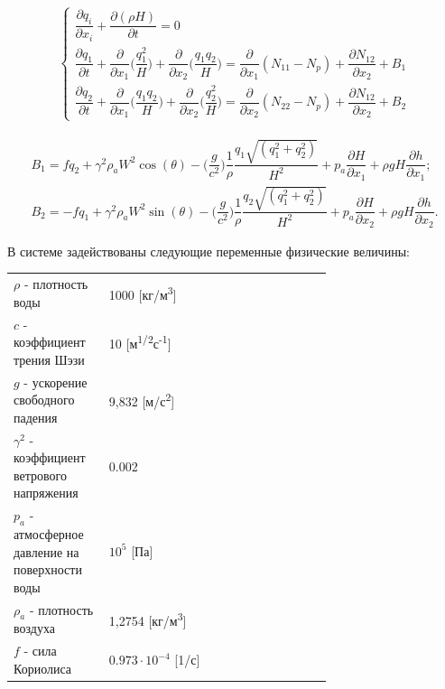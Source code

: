 \documentclass[14pt]{extreport}
\begin{document}
\begin{eqnarray}\label{eq:task:1}
\begin{cases}
\dfrac{ \partial q_i}{\partial x_i} + \dfrac{\partial(\rho H)}{\partial t} = 0 \\
\dfrac{\partial q_1}{\partial t} + \dfrac{\partial}{\partial x_1} \bigg(\dfrac{q_1^2}{H}\bigg)+\dfrac{\partial }{\partial x_2}\bigg(\dfrac{q_1 q_2}{H}\bigg) = \dfrac{\partial}{\partial x_1} (N_{11}-N_p) + \dfrac{\partial N_{12}}{\partial x_2} + B_1 \\
\dfrac{\partial q_2}{\partial t} + \dfrac{\partial}{\partial x_1} \bigg(\dfrac{q_1 q_2}{H}\bigg)+\dfrac{\partial }{\partial x_2}\bigg(\dfrac{q_2^2}{H}\bigg) = \dfrac{\partial}{\partial x_2} (N_{22}-N_p) + \dfrac{\partial N_{12}}{\partial x_2} + B_2
\end{cases}
\end{eqnarray}


\begin{equation}\label{eq:task:2}
\begin{aligned}
B_1=fq_2+\gamma^2\rho_aW^2\cos(\theta)-\bigg(\dfrac{g}{c^2}\bigg)\dfrac{1}{\rho}\dfrac{q_1\sqrt{(q_1^2+q_2^2)}}{H^2} + p_a \dfrac{\partial H}{\partial x_1} + \rho gH\dfrac{\partial h}{\partial x_1}; \\
B_2=-fq_1+\gamma^2\rho_aW^2\sin(\theta)-\bigg(\dfrac{g}{c^2}\bigg)\dfrac{1}{\rho}\dfrac{q_2\sqrt{(q_1^2+q_2^2)}}{H^2} + p_a \dfrac{\partial H}{\partial x_2} + \rho gH\dfrac{\partial h}{\partial x_2}.
\end{aligned}
\end{equation}

В системе задействованы следующие переменные физические величины:

\begin{threeparttable}
\begin{longtable}[H]{lp{0.7\linewidth}}
{$\rho$} - плотность воды & 1000 [кг/м\textsuperscript3] \\
{$c$} - коэффициент трения Шэзи & 10 [м\textsuperscript{1/2}с\textsuperscript{-1}] \\
{$g$} - ускорение свободного падения & 9,832 [м/с\textsuperscript{2}] \\
{$\gamma^2$} - коэффициент ветрового напряжения & 0.002 \\

{$p_a$} - атмосферное давление на поверхности воды & $10^5$ [Па] \\
{$\rho_a$} - плотность воздуха & 1,2754 [кг/м\textsuperscript3] \\
{$f$} - сила Кориолиса & $0.973 \cdot 10^{-4}$ [1/с] \\
\end{longtable} 
\end{threeparttable}
\end{document}

